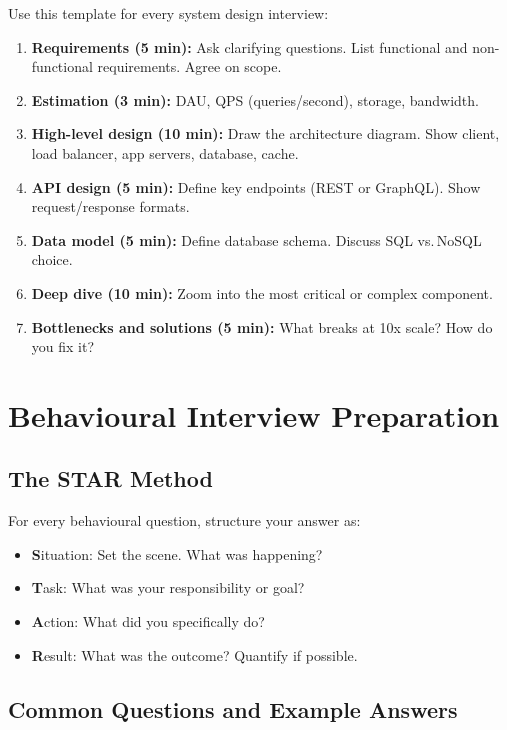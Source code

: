 \documentclass[12pt, a4paper, oneside]{book}
\begin{document}
Use this template for every system design interview:

\begin{enumerate}[leftmargin=2em]
    \item \textbf{Requirements (5 min):} Ask clarifying questions. List functional and non-functional requirements. Agree on scope.
    \item \textbf{Estimation (3 min):} DAU, QPS (queries/second), storage, bandwidth.
    \item \textbf{High-level design (10 min):} Draw the architecture diagram. Show client, load balancer, app servers, database, cache.
    \item \textbf{API design (5 min):} Define key endpoints (REST or GraphQL). Show request/response formats.
    \item \textbf{Data model (5 min):} Define database schema. Discuss SQL vs.\,NoSQL choice.
    \item \textbf{Deep dive (10 min):} Zoom into the most critical or complex component.
    \item \textbf{Bottlenecks and solutions (5 min):} What breaks at 10x scale? How do you fix it?
\end{enumerate}

\section{Behavioural Interview Preparation}

\subsection{The STAR Method}

For every behavioural question, structure your answer as:

\begin{itemize}[leftmargin=2em]
    \item \textbf{S}ituation: Set the scene. What was happening?
    \item \textbf{T}ask: What was your responsibility or goal?
    \item \textbf{A}ction: What did you specifically do?
    \item \textbf{R}esult: What was the outcome? Quantify if possible.
\end{itemize}

\subsection{Common Questions and Example Answers}
\end{document}
